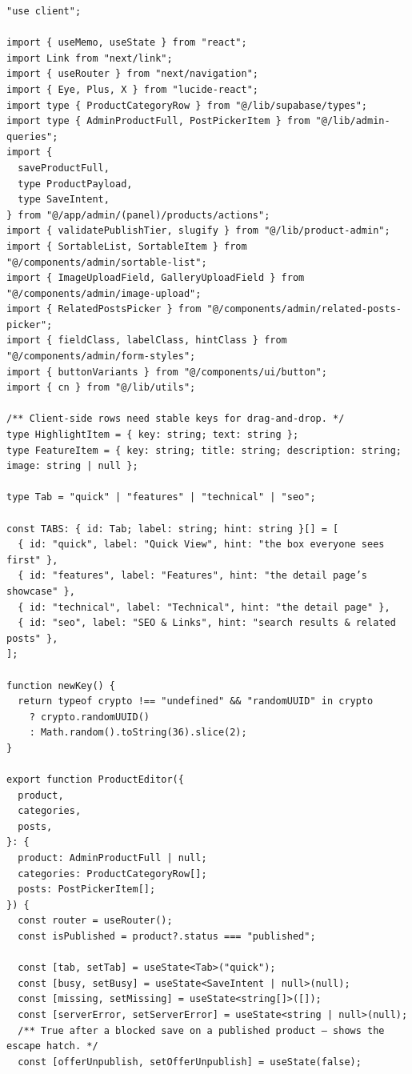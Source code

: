 \documentclass[11pt,a4paper]{article}
\begin{document}
\begin{lstlisting}
"use client";

import { useMemo, useState } from "react";
import Link from "next/link";
import { useRouter } from "next/navigation";
import { Eye, Plus, X } from "lucide-react";
import type { ProductCategoryRow } from "@/lib/supabase/types";
import type { AdminProductFull, PostPickerItem } from "@/lib/admin-queries";
import {
  saveProductFull,
  type ProductPayload,
  type SaveIntent,
} from "@/app/admin/(panel)/products/actions";
import { validatePublishTier, slugify } from "@/lib/product-admin";
import { SortableList, SortableItem } from "@/components/admin/sortable-list";
import { ImageUploadField, GalleryUploadField } from "@/components/admin/image-upload";
import { RelatedPostsPicker } from "@/components/admin/related-posts-picker";
import { fieldClass, labelClass, hintClass } from "@/components/admin/form-styles";
import { buttonVariants } from "@/components/ui/button";
import { cn } from "@/lib/utils";

/** Client-side rows need stable keys for drag-and-drop. */
type HighlightItem = { key: string; text: string };
type FeatureItem = { key: string; title: string; description: string; image: string | null };

type Tab = "quick" | "features" | "technical" | "seo";

const TABS: { id: Tab; label: string; hint: string }[] = [
  { id: "quick", label: "Quick View", hint: "the box everyone sees first" },
  { id: "features", label: "Features", hint: "the detail page’s showcase" },
  { id: "technical", label: "Technical", hint: "the detail page" },
  { id: "seo", label: "SEO & Links", hint: "search results & related posts" },
];

function newKey() {
  return typeof crypto !== "undefined" && "randomUUID" in crypto
    ? crypto.randomUUID()
    : Math.random().toString(36).slice(2);
}

export function ProductEditor({
  product,
  categories,
  posts,
}: {
  product: AdminProductFull | null;
  categories: ProductCategoryRow[];
  posts: PostPickerItem[];
}) {
  const router = useRouter();
  const isPublished = product?.status === "published";

  const [tab, setTab] = useState<Tab>("quick");
  const [busy, setBusy] = useState<SaveIntent | null>(null);
  const [missing, setMissing] = useState<string[]>([]);
  const [serverError, setServerError] = useState<string | null>(null);
  /** True after a blocked save on a published product — shows the escape hatch. */
  const [offerUnpublish, setOfferUnpublish] = useState(false);


\end{lstlisting}
\end{document}
